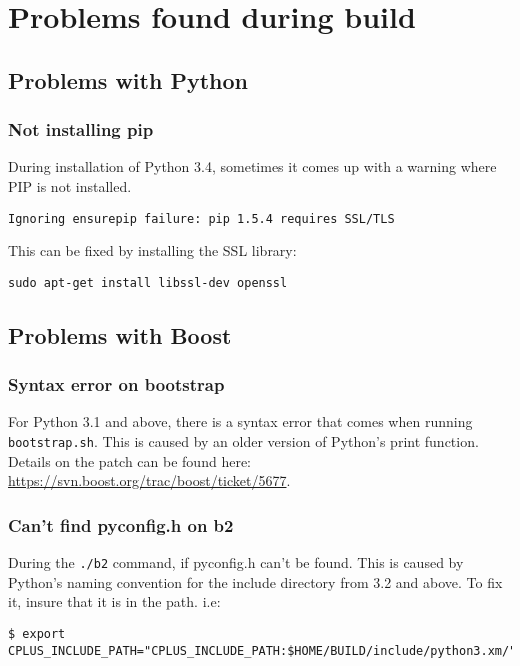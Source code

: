 
\chapter{Problems found during build} %
\label{cha:problems_found_during_build}

\section{Problems with Python} %
\label{sec:problems_with_python}

\subsection{Not installing pip} %
\label{sub:not_installing_pip}

During installation of Python 3.4, sometimes it comes up with a warning where PIP is not installed.

\lstinline{Ignoring ensurepip failure: pip 1.5.4 requires SSL/TLS}

This can be fixed by installing the SSL library:

\lstinline{sudo apt-get install libssl-dev openssl}

\section{Problems with Boost} %
\label{sec:problems_with_boost}

\subsection{Syntax error on bootstrap}

For Python 3.1 and above, there is a syntax error that comes when running \lstinline{bootstrap.sh}. This is caused by an older version of Python's print function. Details on the patch can be found here: \url{https://svn.boost.org/trac/boost/ticket/5677}.

\subsection{Can't find pyconfig.h on b2} %

During the \lstinline{./b2} command, if pyconfig.h can't be found. This is caused by Python's naming convention for the include directory from 3.2 and above. To fix it, insure that it is in the path. i.e:
\begin{lstlisting}[style=inlineBash]
$ export CPLUS_INCLUDE_PATH="CPLUS_INCLUDE_PATH:$HOME/BUILD/include/python3.xm/"
\end{lstlisting}

